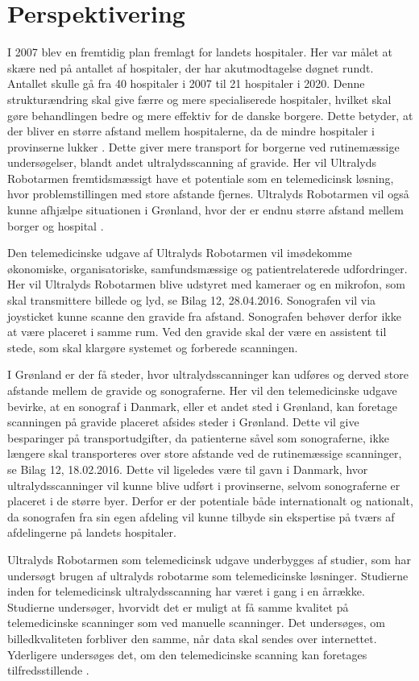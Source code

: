 \chapter{Perspektivering}
I 2007 blev en fremtidig plan fremlagt for landets hospitaler. Her var målet at skære ned på antallet af hospitaler, der har akutmodtagelse døgnet rundt. Antallet skulle gå fra 40 hospitaler i 2007 til 21 hospitaler i 2020. Denne strukturændring skal give færre og mere specialiserede hospitaler, hvilket skal gøre behandlingen bedre og mere effektiv for de danske borgere. Dette betyder, at der bliver en større afstand mellem hospitalerne, da de mindre hospitaler i provinserne lukker \cite{supersygehus}. Dette giver mere transport for borgerne ved rutinemæssige undersøgelser, blandt andet ultralydsscanning af gravide. Her vil Ultralyds Robotarmen fremtidsmæssigt have et potentiale som en telemedicinsk løsning, hvor problemstillingen med store afstande fjernes. Ultralyds Robotarmen vil også kunne afhjælpe situationen i Grønland, hvor der er endnu større afstand mellem borger og hospital \cite{greenland}.

Den telemedicinske udgave af Ultralyds Robotarmen vil imødekomme økonomiske, organisatoriske, samfundsmæssige og patientrelaterede udfordringer. Her vil Ultralyds Robotarmen blive udstyret med kameraer og en mikrofon, som skal transmittere billede og lyd, se Bilag 12, 28.04.2016. Sonografen vil via joysticket kunne scanne den gravide fra afstand. Sonografen behøver derfor ikke at være placeret i samme rum. Ved den gravide skal der være en assistent til stede, som skal klargøre systemet og forberede scanningen.

I Grønland er der få steder, hvor ultralydsscanninger kan udføres og derved store afstande mellem de gravide og sonograferne. Her vil den telemedicinske udgave bevirke, at en sonograf i Danmark, eller et andet sted i Grønland, kan foretage scanningen på gravide placeret afsides steder i Grønland. Dette vil give besparinger på transportudgifter, da patienterne såvel som sonograferne, ikke længere skal transporteres over store afstande ved de rutinemæssige scanninger, se Bilag 12, 18.02.2016. 
Dette vil ligeledes være til gavn i Danmark, hvor ultralydsscanninger vil kunne blive udført i provinserne, selvom sonograferne er placeret i de større byer. Derfor er der potentiale både internationalt og nationalt, da sonografen fra sin egen afdeling vil kunne tilbyde sin ekspertise på tværs af afdelingerne på landets hospitaler. 

Ultralyds Robotarmen som telemedicinsk udgave underbygges af studier, som har undersøgt brugen af ultralyds robotarme som telemedicinske løsninger. Studierne inden for telemedicinsk ultralydsscanning har været i gang i en årrække. Studierne undersøger, hvorvidt det er muligt at få samme kvalitet på telemedicinske scanninger som ved manuelle scanninger. Det undersøges, om billedkvaliteten forbliver den samme, når data skal sendes over internettet. Yderligere undersøges det, om den telemedicinske scanning kan foretages tilfredsstillende \cite{8}\cite{5}\cite{18}\cite{Hjerterobot}. 





